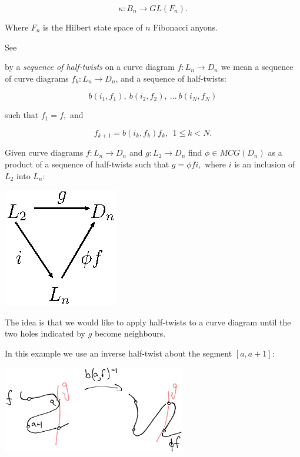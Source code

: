 \documentclass[12pt,a4paper]{article}
\begin{document}
    $$ \kappa : B_n \to GL(F_n).$$

Where $F_n$ is the Hilbert state space of $n$ Fibonacci anyons.

See \cite{Pfeifer12, Pfeifer14}




 by a {\it sequence of half-twists} on a curve
diagram $f:L_n\to D_n$ we mean a
sequence of curve diagrams $f_k: L_n\to D_n$, and a sequence of half-twists:

        $$ b(i_1, f_1),\ b(i_2, f_2),\ ...\ b(i_N, f_N) $$

such that $f_1=f,$ and

        $$ f_{k+1} = b(i_k, f_k) f_k,\ \  \text{} 1\leq k<N.$$


Given curve diagrams $f:L_n\to D_n$ and $g:L_2\to D_n$
find $\phi\in MCG(D_n)$ as a product of
a sequence of half-twists such that
$g = \phi f i,$ where $i$ is an inclusion of $L_2$ into $L_n:$

\begin{center}
\includegraphics{halftwist-factor.eps}
\end{center}

The idea is that we would like to apply half-twists to a curve diagram
until the two holes indicated by $g$ become neighbours.


In this example we use an inverse half-twist about the segment $[a, a+1]:$

\begin{center}
\includegraphics[width=0.6\textwidth]{example-problem-1.eps}
\end{center}
\end{document}
